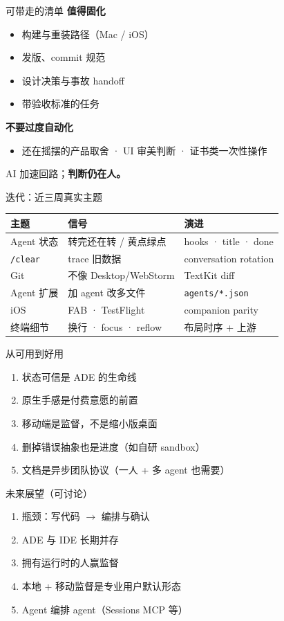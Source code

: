 \documentclass[aspectratio=169,10pt,UTF8]{ctexbeamer}
\begin{document}
\begin{frame}{可带走的清单}
  \textbf{值得固化}
  \begin{itemize}
    \item 构建与重装路径（Mac / iOS）
    \item 发版、commit 规范
    \item 设计决策与事故 handoff
    \item 带验收标准的任务
  \end{itemize}
  \textbf{不要过度自动化}
  \begin{itemize}
    \item 还在摇摆的产品取舍 · UI 审美判断 · 证书类一次性操作
  \end{itemize}
  \centering AI 加速回路；\textbf{判断仍在人。}
\end{frame}

\begin{frame}{迭代：近三周真实主题}
  \small
  \begin{tabular}{@{}llp{4.2cm}@{}}
    \toprule
    主题 & 信号 & 演进 \\
    \midrule
    Agent 状态 & 转完还在转 / 黄点绿点 & hooks · title · done \\
    \texttt{/clear} & trace 旧数据 & conversation rotation \\
    Git & 不像 Desktop/WebStorm & TextKit diff \\
    Agent 扩展 & 加 agent 改多文件 & \texttt{agents/*.json} \\
    iOS & FAB · TestFlight & companion parity \\
    终端细节 & 换行 · focus · reflow & 布局时序 + 上游 \\
    \bottomrule
  \end{tabular}
\end{frame}

\begin{frame}{从可用到好用}
  \begin{enumerate}
    \item 状态可信是 ADE 的生命线
    \item 原生手感是付费意愿的前置
    \item 移动端是监督，不是缩小版桌面
    \item 删掉错误抽象也是进度（如自研 sandbox）
    \item 文档是异步团队协议（一人 + 多 agent 也需要）
  \end{enumerate}
\end{frame}

\begin{frame}{未来展望（可讨论）}
  \begin{enumerate}
    \item 瓶颈：写代码 $\to$ 编排与确认
    \item ADE 与 IDE 长期并存
    \item 拥有运行时的人赢监督
    \item 本地 + 移动监督是专业用户默认形态
    \item Agent 编排 agent（Sessions MCP 等）
  \end{enumerate}
\end{frame}
\end{document}
